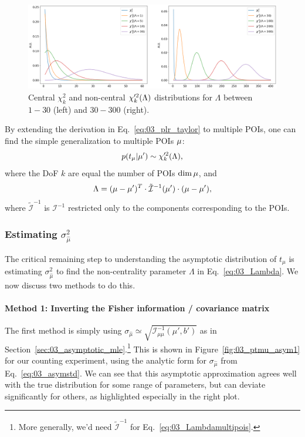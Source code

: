 \begin{figure}[htb]
  \centering
  \includegraphics[width=\textwidth]{figures/03-Stats/06-asymptotic-plr/1.png}
  \caption{Central $\chi^2_k$ and non-central $\chi^{\prime 2}_k(\Lambda)$ distributions for $\Lambda$ between $1-30$ (left) and $30-300$ (right).}
  \label{fig:03_noncentralchi2}
\end{figure}

By extending the derivation in Eq.~\ref{eq:03_plr_taylor} to multiple POIs, one can find the simple generalization to multiple POIs $\mathbf{\mu}$:
\begin{equation}
p(t_\mu|\mu') \sim \chi^{\prime 2}_k(\Lambda),
\label{eq:03_chi2multipois}
\end{equation}
where the DoF $k$ are equal the number of POIs $\dim\mathbf{\mu}$, and 
\begin{equation}
\Lambda = (\mathbf{\mu} - \mathbf{\mu}')^T \cdot \tilde{\mathcal I}^{-1}(\mathbf{\mu}') \cdot (\mathbf{\mu} - \mathbf{\mu}'),
\label{eq:03_Lambdamultipois}
\end{equation}
where $\tilde{\mathcal I}^{-1}$ is $\mathcal I^{-1}$ restricted only to the components corresponding to the POIs.


\subsubsection{Estimating \texorpdfstring{$\sigma_{\hat\mu}^2$}{σ2}}

The critical remaining step to understanding the asymptotic distribution of $t_\mu$ is estimating $\sigma_{\hat\mu}^2$ to find the non-centrality parameter $\Lambda$ in Eq.~\ref{eq:03_Lambda}.
We now discuss two methods to do this.

\paragraph{Method 1: Inverting the Fisher information / covariance matrix}

The first method is simply using $\sigma_{\hat\mu} \simeq \sqrt{\mathcal I^{-1}_{\mu\mu}(\mu', b')}$ as in Section~\ref{sec:03_asymptotic_mle}.\footnote{More generally, we'd need $\tilde{\mathcal I}^{-1}$ for Eq.~\ref{eq:03_Lambdamultipois}.}
This is shown in Figure~\ref{fig:03_ptmu_asym1} for our counting experiment, using the analytic form for $\sigma_{\hat\mu}$ from Eq.~\ref{eq:03_asymstd}.
We can see that this asymptotic approximation agrees well with the true distribution for some range of parameters, but can deviate significantly for others, as highlighted especially in the right plot.

